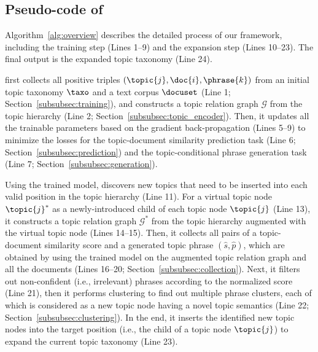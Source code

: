 \subsection{Pseudo-code of \proposed}
\label{subsec:pseudocode}
Algorithm~\ref{alg:overview} describes the detailed process of our framework, including the training step (Lines 1--9) and the expansion step (Lines 10--23). 
The final output is the expanded topic taxonomy (Line 24).



\proposed first collects all positive triples $(\topic{j}, \doc{i}, \phrase{k})$ from an initial topic taxonomy $\taxo$ and a text corpus $\docuset$ (Line 1; Section~\ref{subsubsec:training}), and constructs a topic relation graph $\mathcal{G}$ from the topic hierarchy (Line 2; Section~\ref{subsubsec:topic_encoder}).
Then, it updates all the trainable parameters based on the gradient back-propagation (Lines 5--9) to minimize the losses for the topic-document similarity prediction task (Line 6; Section~\ref{subsubsec:prediction}) and the topic-conditional phrase generation task (Line 7; Section~\ref{subsubsec:generation}).

Using the trained model, \proposed discovers new topics that need to be inserted into each valid position in the topic hierarchy (Line 11).
For a virtual topic node $\topic{j}^*$ as a newly-introduced child of each topic node $\topic{j}$ (Line 13), it constructs a topic relation graph $\mathcal{G}^*$ from the topic hierarchy augmented with the virtual topic node (Lines 14--15).
Then, it collects all pairs of a topic-document similarity score and a generated topic phrase  $(\hat{s}, \hat{p})$, which are obtained by using the trained model on the augmented topic relation graph and all the documents (Lines 16--20; Section~\ref{subsubsec:collection}).
Next, it filters out non-confident (i.e., irrelevant) phrases according to the normalized score (Line 21), then it performs clustering to find out multiple phrase clusters, each of which is considered as a new topic node having a novel topic semantics (Line 22; Section~\ref{subsubsec:clustering}).
In the end, it inserts the identified new topic nodes into the target position (i.e., the child of a topic node $\topic{j}$) to expand the current topic taxonomy (Line 23).


